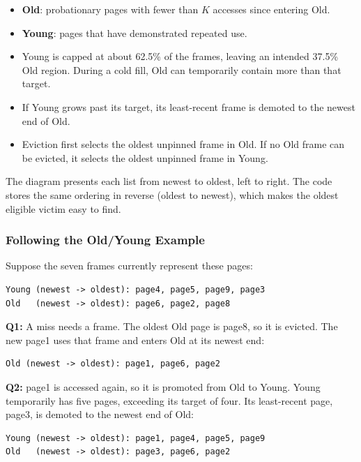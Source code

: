 \documentclass[12pt,a4paper]{article}
\begin{document}
\begin{itemize}
    \item \textbf{Old}: probationary pages with fewer than $K$ accesses since entering Old.
    \item \textbf{Young}: pages that have demonstrated repeated use.
    \item Young is capped at about 62.5\% of the frames, leaving an intended 37.5\% Old region.
          During a cold fill, Old can temporarily contain more than that target.
    \item If Young grows past its target, its least-recent frame is demoted to the newest end of Old.
    \item Eviction first selects the oldest unpinned frame in Old. If no Old frame can be evicted,
          it selects the oldest unpinned frame in Young.
\end{itemize}

The diagram presents each list from newest to oldest, left to right. The code stores the same
ordering in reverse (oldest to newest), which makes the oldest eligible victim easy to find.

\subsubsection{Following the Old/Young Example}

Suppose the seven frames currently represent these pages:

\begin{verbatim}
Young (newest -> oldest): page4, page5, page9, page3
Old   (newest -> oldest): page6, page2, page8
\end{verbatim}

\textbf{Q1:} A miss needs a frame. The oldest Old page is page8, so it is evicted. The new page1
uses that frame and enters Old at its newest end:

\begin{verbatim}
Old (newest -> oldest): page1, page6, page2
\end{verbatim}

\textbf{Q2:} page1 is accessed again, so it is promoted from Old to Young. Young temporarily has
five pages, exceeding its target of four. Its least-recent page, page3, is demoted to the newest
end of Old:

\begin{verbatim}
Young (newest -> oldest): page1, page4, page5, page9
Old   (newest -> oldest): page3, page6, page2
\end{verbatim}
\end{document}
